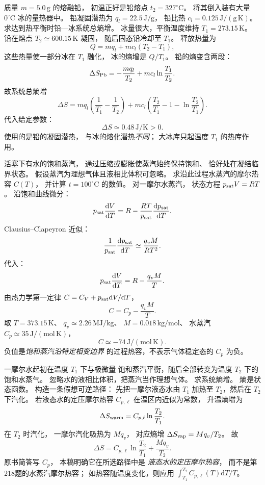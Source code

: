 质量 $m=5.0\,\mathrm g$ 的熔融铅，
初温正好是铅熔点
$t_2=327^\circ\mathrm C$。
将其倒入装有大量
$0^\circ\mathrm C$ 冰的量热器中。
铅凝固潜热为
$q_l=22.5\,\mathrm{J/g}$，
铅比热
$c_l=0.125\,\mathrm{J/(g\,K)}$。
求达到热平衡时铅—冰系统总熵增。
\exsolution
冰量很大，平衡温度维持
$T_1=273.15\,\mathrm K$。
铅在熔点
$T_2\simeq600.15\,\mathrm K$ 凝固，
随后固态铅冷却至 $T_1$。
释放热量为
\[
Q=m q_l+mc_l(T_2-T_1),
\]
这些热量使一部分冰在 $T_1$ 融化，
冰的熵增是 $Q/T_1$。
铅的熵变含两段：
\[
\Delta S_{\rm Pb}
=-\frac{mq_l}{T_2}
+mc_l\ln\frac{T_1}{T_2}.
\]
故系统总熵增
\[
\boxed{\Delta S=
mq_l\left(\frac1{T_1}-\frac1{T_2}\right)
+mc_l\left(\frac{T_2}{T_1}-1
-\ln\frac{T_2}{T_1}\right)}.
\]
代入给定参数：
\[
\boxed{\Delta S\simeq0.48\,\mathrm{J/K}>0}.
\]
\excheck 使用的是铅的凝固潜热，
与冰的熔化潜热\emph{不同}；
大冰库只起温度 $T_1$ 的热库作用。

活塞下有水的饱和蒸汽，
通过压缩或膨胀使蒸汽始终保持饱和、
恰好处在凝结临界状态。
假设蒸汽为理想气体且液相比体积可忽略。
求沿此过程水蒸汽的摩尔热容 $C(T)$，
并计算 $t=100^\circ\mathrm C$ 的数值。
\exsolution
对一摩尔水蒸汽，
状态方程
$p_{\rm sat}V=RT$。
沿饱和曲线微分：
\[
p_{\rm sat}\frac{\mathrm dV}{\mathrm dT}
=R-\frac{RT}{p_{\rm sat}}
\frac{\mathrm dp_{\rm sat}}{\mathrm dT}.
\]
Clausius--Clapeyron 近似：
\[
\frac1{p_{\rm sat}}
\frac{\mathrm dp_{\rm sat}}{\mathrm dT}
\simeq\frac{q_vM}{RT^2}.
\]
代入：
\[
p_{\rm sat}\frac{\mathrm dV}{\mathrm dT}
=R-\frac{q_vM}{T}.
\]
由热力学第一定律
$C=C_V+p_{\rm sat}\mathrm dV/\mathrm dT$，
\[
\boxed{C=C_p-\frac{q_vM}{T}}.
\]
取 $T=373.15\,\mathrm K$、
$q_v\simeq2.26\,\mathrm{MJ/kg}$、
$M=0.018\,\mathrm{kg/mol}$、
水蒸汽 $C_p\simeq35\,\mathrm{J/(mol\,K)}$，
\[
\boxed{C\simeq-74\,\mathrm{J/(mol\,K)}}.
\]
\excheck 负值是\emph{饱和蒸汽沿特定相变边界}
的过程热容，不表示气体稳定态的 $C_p$ 为负。

一摩尔水起初在温度 $T_1$ 下与极微量
饱和蒸汽平衡，随后全部转变为温度
$T_2$ 下的饱和水蒸气。
忽略水的液相比体积，把蒸汽当作理想气体。
求系统熵增。
\exsolution
熵是状态函数。
构造一条假想可逆路径：
先把一摩尔液态水由 $T_1$
加热至 $T_2$，然后在 $T_2$ 下汽化。
若液态水的定压摩尔热容
$C_{p,\ell}$ 在温区内近似为常数，
升温熵增为
\[
\Delta S_{\rm warm}
=C_{p,\ell}\ln\frac{T_2}{T_1}.
\]
在 $T_2$ 时汽化，
一摩尔汽化吸热为 $Mq_v$，
对应熵增
$\Delta S_{\rm vap}=Mq_v/T_2$。
故
\[
\boxed{\Delta S=
C_{p,\ell}\ln\frac{T_2}{T_1}
+\frac{Mq_v}{T_2}}.
\]
\excheck 原书简答写 $C_p$，
本稿明确它在所选路径中是
\emph{液态水的定压摩尔热容}，
而不是第218题的水蒸汽摩尔热容；
如热容随温度变化，则应用
$\int_{T_1}^{T_2}C_{p,\ell}(T)\mathrm dT/T$。
